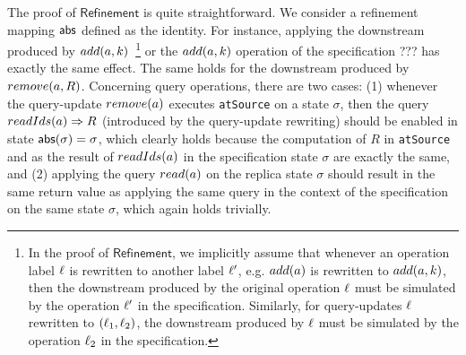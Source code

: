 The proof of $\mathsf{Refinement}$ is quite straightforward. We consider a refinement mapping $\refmap$ defined as the identity. For instance, applying the downstream produced by $\alabelshort[add]{a,k}$~\footnote{In the proof of $\mathsf{Refinement}$, we implicitly assume that whenever an operation label $\alabel$ is rewritten to another label $\alabel'$, e.g. $\alabelshort[add]{a}$ is rewritten to $\alabelshort[add]{a,k}$, then the downstream produced by the original operation $\alabel$ must be simulated by the operation $\alabel'$ in the specification. Similarly, for query-updates $\alabel$ rewritten to $(\alabel_1,\alabel_2)$, the downstream produced by $\alabel$ must be simulated by the operation $\alabel_2$ in the specification.}   or the $\alabelshort[add]{a,k}$ operation of the specification ??? has exactly the same effect. The same holds for the downstream produced by $\alabelshort[remove]{a,R}$. Concerning query operations, there are two cases: (1) whenever the query-update $\alabelshort[remove]{a}$ executes {\tt atSource} on a state $\sigma$, then the query $\alabellong[readIds]{a}{R}{}$ (introduced by the query-update rewriting) should be enabled in state $\refmap(\sigma)=\sigma$, which clearly holds because the computation of $R$ in {\tt atSource} and as the result of $\alabelshort[readIds]{a}$ in the specification state $\sigma$ are exactly the same, and (2) applying the query $\alabelshort[read]{a}$ on the replica state $\sigma$ should result in the same return value as applying the same query in the context of the specification on the same state $\sigma$, which again holds trivially.

